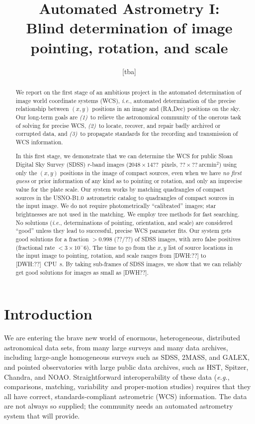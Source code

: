 \documentclass[12pt,preprint]{aastex}
\newcommand{\latin}[1]{\textit{#1}}
\newcommand{\ie}{\latin{i.e.}}
\newcommand{\eg}{\latin{e.g.}}
\newcommand{\usnob}{USNO-B1.0}
\begin{document}
\title{
  Automated Astrometry I:\\
  Blind determination of image pointing, rotation, and scale
}
\author{
  [tba]
}

\begin{abstract}
We report on the first stage of an ambitious project in the automated
determination of image world coordinate systems (WCS), \ie, automated
determination of the precise relationship between $(x,y)$ positions in
an image and (RA,Dec) positions on the sky.  Our long-term goals are
\textsl{(1)}~to relieve the astronomical community of the onerous task
of solving for precise WCS, \textsl{(2)}~to locate, recover, and
repair badly archived or corrupted data, and \textsl{(3)}~to propagate
standards for the recording and transmission of WCS information.

In this first stage, we demonstrate that we can determine the WCS for
public Sloan Digital Sky Survey (SDSS) $r$-band images
($2048\times14??$~pixels, $??\times??~\mathrm{arcmin^2}$) using only
the $(x,y)$ positions in the image of compact sources, even when we
have \emph{no first guess} or prior information of any kind as to
pointing or rotation, and only an imprecise value for the plate scale.
Our system works by matching quadrangles of compact sources in the
\usnob\ astrometric catalog to quadrangles of compact sources in the
input image.  We do not require photometrically ``calibrated'' images;
star brightnesses are not used in the matching.  We employ tree
methods for fast searching.  No solutions (\ie, determinations of
pointing, orientation, and scale) are considered ``good'' unless they
lead to successful, precise WCS parameter fits.  Our system gets good
solutions for a fraction $>0.998$ (??/??) of SDSS images, with zero
false positives (fractional rate $<3\times 10^-6$).  The time to go
from the $x,y$ list of source locations in the input image to
pointing, rotation, and scale ranges from [DWH:??] to [DWH:??]~CPU~s.
By taking sub-frames of SDSS images, we show that we can reliably get
good solutions for images as small as [DWH??].
\end{abstract}


\section{Introduction}

We are entering the brave new world of enormous, heterogeneous,
distributed astronomical data sets, from many large surveys and many
data archives, including large-angle homogeneous surveys such as SDSS,
2MASS, and GALEX, and pointed observatories with large public data
archives, such as HST, Spitzer, Chandra, and NOAO.  Straightforward
interoperability of these data (\eg, comparisons, matching,
variability and proper-motion studies) requires that they all have
correct, standards-compliant astrometric (WCS) information.  The data
are not always so supplied; the community needs an automated
astrometry system that will provide.
\end{document}
